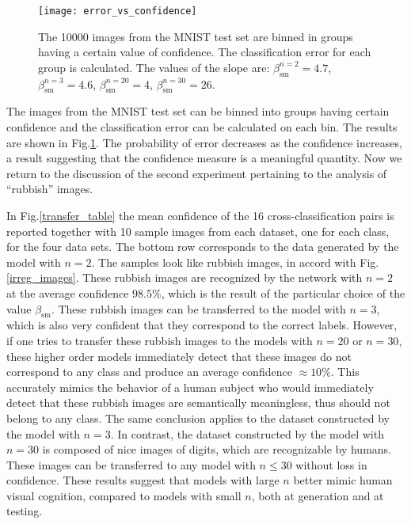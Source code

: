 \documentclass[12pt]{article} %
\begin{document}
\begin{figure}[h]
\begin{center}
\texttt{[image: error\_vs\_confidence]}
\end{center}
\caption{\footnotesize{The 10000 images from the MNIST test set are binned in groups having a certain value of confidence. The classification error for each group is calculated. The values of the slope are: $\beta_{\text{sm}}^{n=2}=4.7$, $\beta_{\text{sm}}^{n=3}=4.6$, $\beta_{\text{sm}}^{n=20}=4$, $\beta_{\text{sm}}^{n=30}=26$.}}\label{error_vs_confidence}
\end{figure}
The images from the MNIST test set can be binned into groups having certain confidence and the classification error can be calculated on each bin. The results are shown in Fig.\ref{error_vs_confidence}. The probability of error decreases as the confidence increases, a result suggesting that the confidence measure is a meaningful quantity. Now we return to the discussion of the second experiment pertaining to the analysis of ``rubbish'' images.

In Fig.\ref{transfer_table} the mean confidence of the 16 cross-classification pairs is reported together with 10 sample images from each dataset, one for each class, for the four data sets. The bottom row corresponds to the data generated by the model with $n=2$. The samples look like rubbish images, in accord with Fig.\ref{irreg_images}. These rubbish images are recognized by the network with $n=2$ at the average confidence $98.5\%$, which is the result of the particular choice of the value $\beta_{\text{sm}}$. These rubbish images can be transferred to the model with $n=3$, which is also very confident that they correspond to the correct labels. However, if one tries to transfer these rubbish images to the models with $n=20$ or $n=30$, these higher order models immediately detect that these images do not correspond to any class and produce an average confidence $\approx 10\%$. This accurately mimics the behavior of a human subject who would immediately detect that these rubbish images are semantically meaningless, thus should not belong to any class.  The same conclusion applies to the dataset constructed by the model with $n=3$. In contrast, the dataset constructed by the model with $n=30$ is composed of nice images of digits, which are recognizable by humans. These images can be transferred to any model with $n\leq 30$ without loss in confidence. These results suggest that models with large $n$ better mimic human visual cognition, compared to models with small $n$, both at generation and at testing. 
\end{document}
